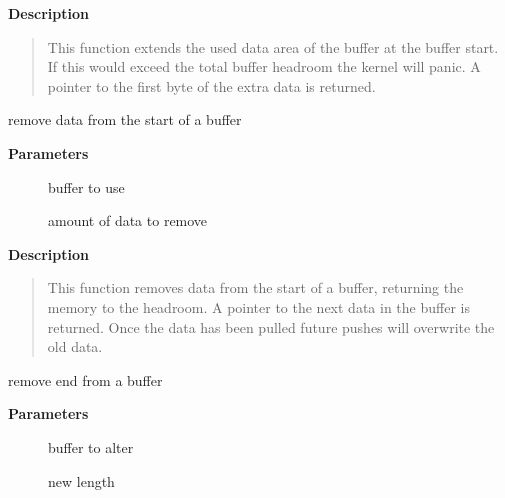 \documentclass[a4paper,8pt,english]{sphinxmanual}
\begin{document}
\textbf{Description}
\begin{quote}

This function extends the used data area of the buffer at the buffer
start. If this would exceed the total buffer headroom the kernel will
panic. A pointer to the first byte of the extra data is returned.
\end{quote}

\begin{fulllineitems}
\label{networking/kapi:c.skb_pull}
remove data from the start of a buffer

\end{fulllineitems}


\textbf{Parameters}
\begin{description}
\item[{}] \leavevmode
buffer to use

\item[{}] \leavevmode
amount of data to remove

\end{description}

\textbf{Description}
\begin{quote}

This function removes data from the start of a buffer, returning
the memory to the headroom. A pointer to the next data in the buffer
is returned. Once the data has been pulled future pushes will overwrite
the old data.
\end{quote}

\begin{fulllineitems}
\label{networking/kapi:c.skb_trim}
remove end from a buffer

\end{fulllineitems}


\textbf{Parameters}
\begin{description}
\item[{}] \leavevmode
buffer to alter

\item[{}] \leavevmode
new length

\end{description}
\end{document}
